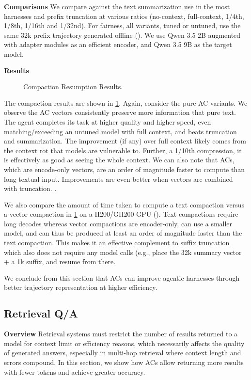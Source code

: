 \textbf{Comparisons}
We compare against the text summarization use in the most harnesses and prefix truncation at various ratios (no-context, full-context, 1/4th, 1/8th, 1/16th and 1/32nd). For fairness, all variants, tuned or untuned, use the same 32k prefix trajectory generated offline (). We use Qwen 3.5 2B augmented with adapter modules as an efficient encoder, and Qwen 3.5 9B as the target model.


\textbf{Results}
\begin{figure}[t]
  \centering
  \caption{Compaction Resumption Results.}
  \label{fig:evalCompaction}
\end{figure}
The compaction results are shown in \cref{fig:evalCompaction}. Again, consider the pure AC variants. We observe the AC vectors consistently preserve more information that pure text. The agent completes its task at higher quality and higher speed, even matching/exceeding an untuned model with full context, and beats truncation and summarization. The improvement (if any) over full context likely comes from the context rot that models are vulnerable to. Further, a 1/10th compression, it is effectively as good as seeing the whole context. We can also note that ACs, which are encode-only vectors, are an order of magnitude faster to compute than long textual input. Improvements are even better when vectors are combined with truncation. .

We also compare the amount of time taken to compute a text compaction versus a vector compaction in \cref{fig:evalCompaction} on a H200/GH200 GPU (). Text compactions require long decodes whereas vector compactions are encoder-only, can use a smaller model, and can thus be produced at least an order of magnitude faster than the text compaction. This makes it an effective complement to suffix truncation which also does not require any model calls (e.g., place the 32k summary vector + a 1k suffix, and resume from there.

We conclude from this section that ACs can improve agentic harnesses through better trajectory representation at higher efficiency.


\subsection{Retrieval Q/A}
\textbf{Overview}
Retrieval systems must restrict the number of results returned to a model for context limit or efficiency reasons, which necessarily affects the quality of generated answers, especially in multi-hop retrieval where context length and errors compound. In this section, we show how ACs allow returning more results with fewer tokens and achieve greater accuracy.


